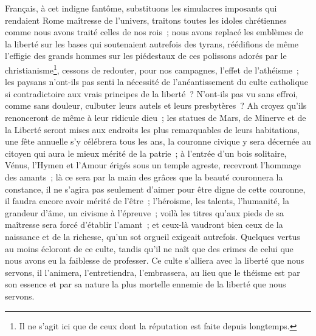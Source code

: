 \documentclass[french,twoside]{book} %
\begin{document}
Français, à cet indigne fantôme, substituons les simulacres imposants qui rendaient Rome maîtresse de l’univers, traitons toutes les idoles chrétiennes comme nous avons traité celles de nos rois ; nous avons replacé les emblèmes de la liberté sur les bases qui soutenaient autrefois des tyrans, réédifions de même l’effigie des grands hommes sur les piédestaux de ces polissons adorés par le christianisme\footnote{ Il ne s’agit ici que de ceux dont la réputation est faite depuis longtemps.}, cessons de redouter, pour nos campagnes, l’effet de l’athéisme ; les paysans n’ont-ils pas senti la nécessité de l’anéantissement du culte catholique si contradictoire aux vrais principes de la liberté ? N’ont-ils pas vu sans effroi, comme sans douleur, culbuter leurs autels et leurs presbytères ? Ah croyez qu’ils renonceront de même à leur ridicule dieu ; les statues de Mars, de Minerve et de la Liberté seront mises aux endroits les plus remarquables de leurs habitations, une fête annuelle s’y célébrera tous les ans, la couronne civique y sera décernée au citoyen qui aura le mieux mérité de la patrie ; à l’entrée d’un bois solitaire, Vénus, l’Hymen et l’Amour érigés sous un temple agreste, recevront l’hommage des amants ; là ce sera par la main des grâces que la beauté couronnera la constance, il ne s’agira pas seulement d’aimer pour être digne de cette couronne, il faudra encore avoir mérité de l’être ; l’héroïsme, les talents, l’humanité, la grandeur d’âme, un civisme à l’épreuve ; voilà les titres qu’aux pieds de sa maîtresse sera forcé d’établir l’amant ; et ceux-là vaudront bien ceux de la naissance et de la richesse, qu’un sot orgueil exigeait autrefois. Quelques vertus au moins écloront de ce culte, tandis qu’il ne naît que des crimes de celui que nous avons eu la faiblesse de professer. Ce culte s’alliera avec la liberté que nous servons, il l’animera, l’entretiendra, l’embrassera, au lieu que le théisme est par son essence et par sa nature la plus mortelle ennemie de la liberté que nous servons.\par
\end{document}
